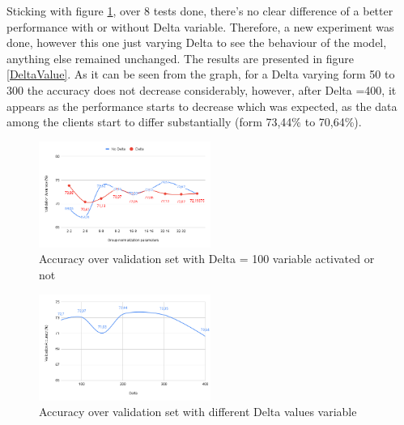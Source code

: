 \documentclass[twocolumn]{article}
\begin{document}
Sticking with figure \ref{AccDiff}, over 8 tests done, there's no clear difference of a better performance with or without Delta variable. Therefore, a new experiment was done, however this one just varying Delta to see the behaviour of the model, anything else remained unchanged. The results are presented in figure \ref{DeltaValue}. As it can be seen from the graph, for a Delta varying form 50 to 300 the accuracy does not decrease considerably, however, after Delta =400, it appears as the performance starts to decrease which was expected, as the data among the clients start to differ substantially (form 73,44\% to 70,64\%).



\begin{figure}
    \centering
    \includegraphics[width=0.5\textwidth,height=.3\textheight]{groupnormalizationDeltaNoDelta.png}
    \caption{Accuracy over validation set with Delta = 100 variable activated or not}
     \label{AccDiff} 
\end{figure}

\begin{figure}
    \centering
    \includegraphics[width=0.5\textwidth,height=.3\textheight]{deltacomparison.png}
    \caption{Accuracy over validation set with different Delta values variable}
     \label{DeltaValues} 
\end{figure}
\end{document}
